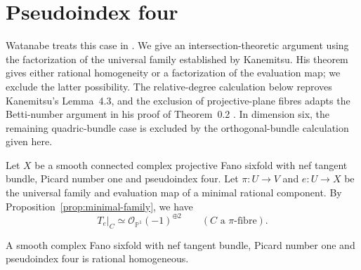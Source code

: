 \section{Pseudoindex four}\label{sec:pseudoindex-four}

Watanabe treats this case in \cite[Theorem~2.4]{Watanabe2021}.
We give an intersection-theoretic argument using the factorization of the
universal family established by Kanemitsu. His theorem gives either
rational homogeneity or a factorization of the evaluation map; we exclude
the latter possibility. The relative-degree calculation below reproves
Kanemitsu's Lemma~4.3, and the exclusion of projective-plane fibres
adapts the Betti-number argument in his proof of Theorem~0.2
\cite{Kanemitsu2017}. In dimension six, the remaining quadric-bundle
case is excluded by the orthogonal-bundle calculation given here.

Let $X$ be a smooth connected complex projective Fano sixfold with nef
tangent bundle, Picard number one and pseudoindex four. Let
$\pi:U\to V$ and $e:U\to X$ be the universal family and evaluation map
of a minimal rational component. By Proposition~\ref{prop:minimal-family}, we have
\[
 T_e|_C\simeq\mathcal O_{\mathbb P^1}(-1)^{\oplus2}
 \qquad(C\text{ a }\pi\text{-fibre}).
\]
\begin{proposition}\label{prop:pseudoindex-four}
A smooth complex Fano sixfold with nef tangent bundle, Picard number one
and pseudoindex four is rational homogeneous.
\end{proposition}

